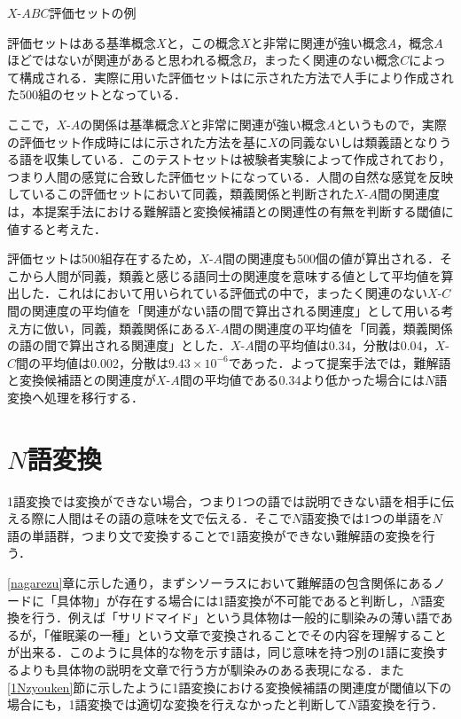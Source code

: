 \documentclass[japanese]{jnlp_1.4}
\begin{document}
\begin{table}[b]
\caption{$X$-$\mathit{ABC}$評価セットの例}
\label{tab:xabc}

\end{table}

評価セットはある基準概念$X$と，この概念$X$と非常に関連が強い概念$A$，概念$A$ほどではないが関連があると思われる概念$B$，まったく関連のない概念$C$によって構成される．実際に用いた評価セットは\cite{Article_05}に示された方法で人手により作成された500組のセットとなっている\cite{Article_04}．

ここで，$X$-$A$の関係は基準概念$X$と非常に関連が強い概念$A$というもので，実際の評価セット作成時には\cite{Article_05}に示された方法を基に$X$の同義ないしは類義語となりうる語を収集している．このテストセットは被験者実験によって作成されており，つまり人間の感覚に合致した評価セットになっている．人間の自然な感覚を反映しているこの評価セットにおいて同義，類義関係と判断された$X$-$A$間の関連度は，本提案手法における難解語と変換候補語との関連性の有無を判断する閾値に値すると考えた．

評価セットは500組存在するため，$X$-$A$間の関連度も500個の値が算出される．そこから人間が同義，類義と感じる語同士の関連度を意味する値として平均値を算出した．これは\cite{Article_04}において用いられている評価式の中で，まったく関連のない$X$-$C$間の関連度の平均値を「関連がない語の間で算出される関連度」として用いる考え方に倣い，同義，類義関係にある$X$-$A$間の関連度の平均値を「同義，類義関係の語の間で算出される関連度」とした．$X$-$A$間の平均値は0.34，分散は0.04，$X$-$C$間の平均値は0.002，分散は$9.43×10^{-6}$であった．よって提案手法では，難解語と変換候補語との関連度が$X$-$A$間の平均値である0.34より低かった場合には$N$語変換へ処理を移行する．



\section{$N$語変換}

1語変換では変換ができない場合，つまり1つの語では説明できない語を相手に伝える際に人間はその語の意味を文で伝える．そこで$N$語変換では1つの単語を$N$語の単語群，つまり文で変換することで1語変換ができない難解語の変換を行う．

\ref{nagarezu}章に示した通り，まずシソーラスにおいて難解語の包含関係にあるノードに「具体物」が存在する場合には1語変換が不可能であると判断し，$N$語変換を行う．例えば「サリドマイド」という具体物は一般的に馴染みの薄い語であるが，「催眠薬の一種」という文章で変換されることでその内容を理解することが出来る．このように具体的な物を示す語は，同じ意味を持つ別の1語に変換するよりも具体物の説明を文章で行う方が馴染みのある表現になる．また\ref{1Nzyouken}節に示したように1語変換における変換候補語の関連度が閾値以下の場合にも，1語変換では適切な変換を行えなかったと判断して$N$語変換を行う．
\end{document}
